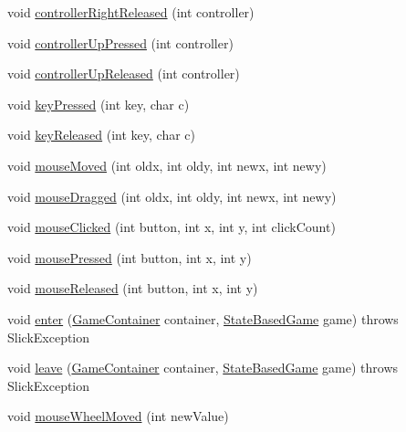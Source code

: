 \begin{DoxyCompactItemize}
\item 
void \mbox{\hyperlink{classorg_1_1newdawn_1_1slick_1_1state_1_1_basic_game_state_aeec0e8b46063fb631111a0e5f168cd01}{controller\+Right\+Released}} (int controller)
\item 
void \mbox{\hyperlink{classorg_1_1newdawn_1_1slick_1_1state_1_1_basic_game_state_a14126c2898a6d16c31255e09dbc31df8}{controller\+Up\+Pressed}} (int controller)
\item 
void \mbox{\hyperlink{classorg_1_1newdawn_1_1slick_1_1state_1_1_basic_game_state_af4be493c79ad2ee89aed6f64b2ebd9fa}{controller\+Up\+Released}} (int controller)
\item 
void \mbox{\hyperlink{classorg_1_1newdawn_1_1slick_1_1state_1_1_basic_game_state_adb2d3de92ca31d17f22d119f93164407}{key\+Pressed}} (int key, char c)
\item 
void \mbox{\hyperlink{classorg_1_1newdawn_1_1slick_1_1state_1_1_basic_game_state_ade382929c931cf15998df10559ae1f87}{key\+Released}} (int key, char c)
\item 
void \mbox{\hyperlink{classorg_1_1newdawn_1_1slick_1_1state_1_1_basic_game_state_a8c96e4bc47056c851c5537dbeb38100b}{mouse\+Moved}} (int oldx, int oldy, int newx, int newy)
\item 
void \mbox{\hyperlink{classorg_1_1newdawn_1_1slick_1_1state_1_1_basic_game_state_a1735e088abcb5a7af3eb5fded03c84a4}{mouse\+Dragged}} (int oldx, int oldy, int newx, int newy)
\item 
void \mbox{\hyperlink{classorg_1_1newdawn_1_1slick_1_1state_1_1_basic_game_state_a6151f33238ecd2109e2a2e6a2eda7c90}{mouse\+Clicked}} (int button, int x, int y, int click\+Count)
\item 
void \mbox{\hyperlink{classorg_1_1newdawn_1_1slick_1_1state_1_1_basic_game_state_ae51588d90bde4c509f2c6fccfe212994}{mouse\+Pressed}} (int button, int x, int y)
\item 
void \mbox{\hyperlink{classorg_1_1newdawn_1_1slick_1_1state_1_1_basic_game_state_a80355facf11747b0ab9c25ccec5ad3d2}{mouse\+Released}} (int button, int x, int y)
\item 
void \mbox{\hyperlink{classorg_1_1newdawn_1_1slick_1_1state_1_1_basic_game_state_a911b009b86365da17fa6c1814ba2e1b4}{enter}} (\mbox{\hyperlink{classorg_1_1newdawn_1_1slick_1_1_game_container}{Game\+Container}} container, \mbox{\hyperlink{classorg_1_1newdawn_1_1slick_1_1state_1_1_state_based_game}{State\+Based\+Game}} game)  throws Slick\+Exception 
\item 
void \mbox{\hyperlink{classorg_1_1newdawn_1_1slick_1_1state_1_1_basic_game_state_ae9a3aab0c109cfe3f3aa56d1d6b4f33e}{leave}} (\mbox{\hyperlink{classorg_1_1newdawn_1_1slick_1_1_game_container}{Game\+Container}} container, \mbox{\hyperlink{classorg_1_1newdawn_1_1slick_1_1state_1_1_state_based_game}{State\+Based\+Game}} game)  throws Slick\+Exception 
\item 
void \mbox{\hyperlink{classorg_1_1newdawn_1_1slick_1_1state_1_1_basic_game_state_ab4d1fd4e3f8f09700b62bb37fd29006a}{mouse\+Wheel\+Moved}} (int new\+Value)
\end{DoxyCompactItemize}


